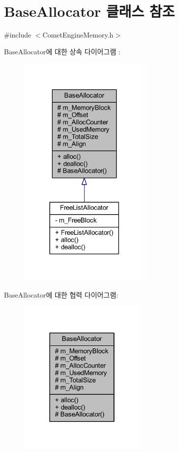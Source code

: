 \hypertarget{class_comet_engine_1_1_core_1_1_memory_1_1_base_allocator}{}\section{Base\+Allocator 클래스 참조}
\label{class_comet_engine_1_1_core_1_1_memory_1_1_base_allocator}


{\ttfamily \#include $<$Comet\+Engine\+Memory.\+h$>$}



Base\+Allocator에 대한 상속 다이어그램 \+: 
\nopagebreak
\begin{figure}[H]
\begin{center}
\leavevmode
\includegraphics[width=185pt]{class_comet_engine_1_1_core_1_1_memory_1_1_base_allocator__inherit__graph}
\end{center}
\end{figure}


Base\+Allocator에 대한 협력 다이어그램\+:\nopagebreak
\begin{figure}[H]
\begin{center}
\leavevmode
\includegraphics[width=178pt]{class_comet_engine_1_1_core_1_1_memory_1_1_base_allocator__coll__graph}
\end{center}
\end{figure}
